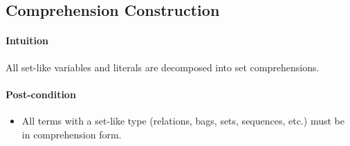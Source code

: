 \documentclass{article}
\begin{document}
\subsection{Comprehension Construction}

\paragraph{Intuition} All set-like variables and literals are decomposed into set comprehensions.

\paragraph{Post-condition}
\begin{itemize}
  \item All terms with a set-like type (relations, bags, sets, sequences, etc.) must be in comprehension form.
\end{itemize}
\end{document}

